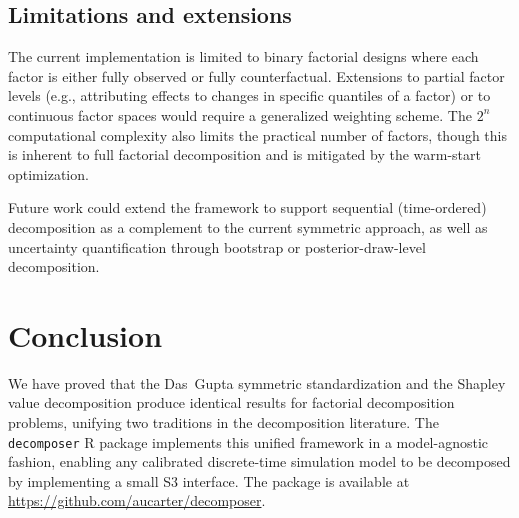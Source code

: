 \documentclass[11pt]{article}
\newcommand{\pkg}[1]{\texttt{#1}}
\begin{document}
\subsection{Limitations and extensions}

The current implementation is limited to binary factorial designs where
each factor is either fully observed or fully counterfactual.
Extensions to partial factor levels (e.g., attributing effects to
changes in specific quantiles of a factor) or to continuous factor
spaces would require a generalized weighting scheme.
The $2^n$ computational complexity also limits the practical number of
factors, though this is inherent to full factorial decomposition and is
mitigated by the warm-start optimization.

Future work could extend the framework to support sequential
(time-ordered) decomposition as a complement to the current symmetric
approach, as well as uncertainty quantification through bootstrap or
posterior-draw-level decomposition.


\section{Conclusion}

We have proved that the Das~Gupta symmetric standardization and the
Shapley value decomposition produce identical results for factorial
decomposition problems, unifying two traditions in the decomposition
literature.
The \pkg{decomposer} R package implements this unified framework in a
model-agnostic fashion, enabling any calibrated discrete-time simulation
model to be decomposed by implementing a small S3 interface.
The package is available at
\url{https://github.com/aucarter/decomposer}.




\end{document}
